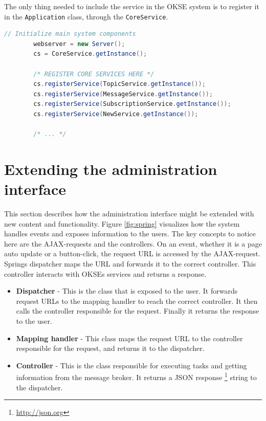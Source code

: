 The only thing needed to include the service in the OKSE system is to register it in the \verb!Application! class, through the \verb!CoreService!.

\begin{lstlisting}[language=Java, captionpos=b, caption=Registering a new service, frame=bt, showstringspaces=false]
        // Initialize main system components
        webserver = new Server();
        cs = CoreService.getInstance();

        /* REGISTER CORE SERVICES HERE */
        cs.registerService(TopicService.getInstance());
        cs.registerService(MessageService.getInstance());
        cs.registerService(SubscriptionService.getInstance());
        cs.registerService(NewService.getInstance());

        /* ... */
\end{lstlisting}

\section{Extending the administration interface}
\label{sec:adding-new-panes}

This section describes how the administration interface might be extended with new content and functionality. Figure \ref{fig:spring} visualizes how the system handles events and exposes information to the users. The key concepts to notice here are the AJAX-requests and the controllers. On an event, whether it is a page auto update or a button-click, the request URL is accessed by the AJAX-request. Springs dispatcher maps the URL and forwards it to the correct controller. This controller interacts with OKSEs services and returns a response.

\begin{itemize}
    \item\textbf{Dispatcher} -  This is the class that is exposed to the user. It forwards request URLs to the mapping handler to reach the correct controller. It then calls the controller responsible for the request. Finally it returns the response to the user. 
    \item\textbf{Mapping handler} - This class maps the request URL to the controller responsible for the request, and returns it to the dispatcher. 
    \item\textbf{Controller} - This is the class responsible for executing tasks and getting information from the message broker. It returns a JSON response \footnote{\url{http://json.org}} string to the dispatcher.  
\end{itemize}

